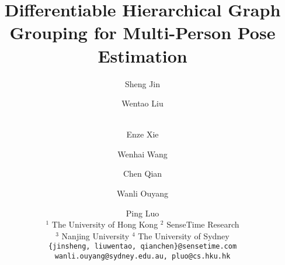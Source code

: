 \documentclass[runningheads]{llncs}
\begin{document}
	\captionsetup[figure]{labelsep=period}
	\captionsetup[table]{labelsep=period}
\pagestyle{headings}
	\mainmatter
	\def\ECCVSubNumber{386}  

	\title{Differentiable Hierarchical Graph Grouping for Multi-Person Pose Estimation}
	
\begin{comment}
	\titlerunning{ECCV-20 submission ID \ECCVSubNumber} 
	\authorrunning{ECCV-20 submission ID \ECCVSubNumber} 
	\author{Anonymous ECCV submission}
	\institute{Paper ID \ECCVSubNumber}
	\end{comment}


\author{Sheng Jin \and
		Wentao Liu\inst{2\dagger} \and \\
		Enze Xie \and Wenhai Wang \and
		Chen Qian \and Wanli Ouyang \and Ping Luo  \\[.21cm]
		$^{1}$ The University of Hong Kong \quad
		$^{2}$ SenseTime Research \\
		$^{3}$ Nanjing University \quad
		$^{4}$ The University of Sydney \\
		\tt\small \{jinsheng, liuwentao, qianchen\}@sensetime.com \quad
		wanli.ouyang@sydney.edu.au, pluo@cs.hku.hk}
	
\institute{}
\maketitle
	
\end{document}

